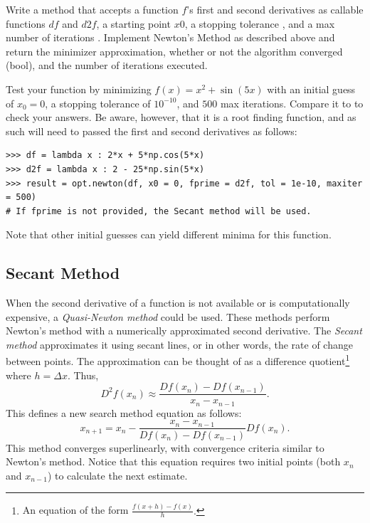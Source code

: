 \begin{problem}
Write a method that accepts a function $f$'s first and second derivatives as callable functions $df$ and $d2f$, a starting point $x0$, a stopping tolerance , and a max number of iterations .
Implement Newton's Method as described above and return the minimizer approximation, whether or not the algorithm converged (bool), and the number of iterations executed.

Test your function by minimizing $f(x) = x^2 + \sin(5x)$ with an initial guess of $x_0 = 0$, a stopping tolerance of $10^{-10}$, and $500$ max iterations.
Compare it to  to check your answers.
Be aware, however, that it is a root finding function, and as such will need to passed the first and second derivatives as follows:
\begin{lstlisting}
>>> df = lambda x : 2*x + 5*np.cos(5*x)
>>> d2f = lambda x : 2 - 25*np.sin(5*x)
>>> result = opt.newton(df, x0 = 0, fprime = d2f, tol = 1e-10, maxiter = 500)
# If fprime is not provided, the Secant method will be used.
\end{lstlisting}
Note that other initial guesses can yield different minima for this function.
\end{problem}

\subsection*{Secant Method} %

When the second derivative of a function is not available or is computationally expensive, a \emph{Quasi-Newton method} could be used.
These methods perform Newton's method with a numerically approximated second derivative.
The \emph{Secant method} approximates it using secant lines, or in other words, the rate of change between points.
The approximation can be thought of as a difference quotient\footnote{An equation of the form $\frac{f(x + h) - f(x)}{h}.$} where $h = \Delta x$.
Thus, $$D^2 f(x_n) \approx \frac{Df(x_n) - Df(x_{n-1})}{x_n - x_{n-1}}.$$
This defines a new search method equation as follows:
$$x_{n+1} = x_n - \frac{x_n - x_{n-1}}{Df(x_n) - Df(x_{n-1})}Df(x_n).$$
This method converges superlinearly, with convergence criteria similar to Newton's method. 
Notice that this equation requires two initial points (both $x_n$ and $x_{n-1}$) to calculate the next estimate.

